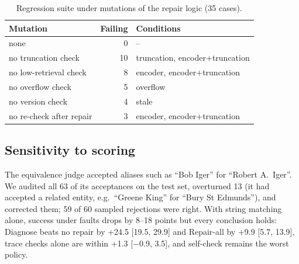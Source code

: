\begin{table}[t]
\caption{Regression suite under mutations of the repair logic (35 cases).}\label{tab:mutation}
\small
\begin{tabular}{lrl}
\toprule
Mutation & Failing & Conditions \\
\midrule
none & 0 & -- \\
no truncation check & 10 & truncation, encoder+truncation \\
no low-retrieval check & 8 & encoder, encoder+truncation \\
no overflow check & 5 & overflow \\
no version check & 4 & stale \\
no re-check after repair & 3 & encoder, encoder+truncation \\
\bottomrule
\end{tabular}
\end{table}

\subsection{Sensitivity to scoring}
The equivalence judge accepted aliases such as ``Bob Iger'' for ``Robert A.\ Iger''. We audited
all 63 of its acceptances on the test set, overturned 13 (it had accepted a related entity, e.g.\
``Greene King'' for ``Bury St Edmunds''), and corrected them; 59 of 60 sampled rejections were
right. With string matching alone, success under faults drops by 8--18 points but every conclusion
holds: Diagnose beats no repair by +24.5 [19.5, 29.9] and Repair-all by +9.9 [5.7, 13.9], trace
checks alone are within +1.3 [$-$0.9, 3.5], and self-check remains the worst policy.
